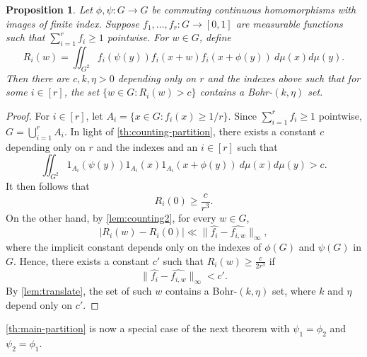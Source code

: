 \documentclass[10pt]{article}
\newtheorem{proposition}[proposition]{Proposition}
\theoremstyle{definition}
\begin{document}
\begin{proposition} \label{prop:partition-bohr-stronger} 
Let $\phi, \psi: G \to G$ be commuting continuous homomorphisms with images of finite index. Suppose $f_1, \ldots, f_r: G \to [0,1]$ are measurable functions such that $\sum_{i=1}^r f_i \geq 1$ pointwise. For $w \in G$, define
\[
  R_i(w) =  \iint_{G^2}  f_i(\psi(y)) f_i(x+w) f_i(x + \phi(y)) \ d\mu(x) d\mu(y). 
\]
Then there are $c, k, \eta >0$ depending only on $r$ and the indexes above such that for some $i \in [r]$, the set
 $\{ w \in G: R_i(w) > c\}$ contains a Bohr-$(k,\eta)$ set. 
\end{proposition}
\begin{proof}

For $i \in [r]$, let $A_i = \{x \in G: f_i(x) \geq 1/r\}$. Since $\sum_{i=1}^r f_i \geq 1$ pointwise, $G = \bigcup_{i=1}^r A_i$. In light of \cref{th:counting-partition}, there exists a constant $c$ depending only on $r$ and the indexes and an $i \in [r]$ such that 
\[
    \iint_{G^2} 1_{A_i} (\psi(y)) 1_{A_i}(x) 1_{A_i}(x + \phi(y)) \ d\mu(x) d\mu(y) > c.
\]
It then follows that
\[
    R_i(0) \geq \frac{c}{r^3}.  
\]
On the other hand, by \cref{lem:counting2}, for every $w \in G$,
\begin{equation*}
\label{eq:partition_R_i}
    |R_i(w) - R_i(0)| \ll \lVert \widehat{f_i} - \widehat{f_{i,w}} \rVert_{\infty},
\end{equation*}
where the implicit constant depends only on the indexes of $\phi(G)$ and $\psi(G)$ in $G$. 
Hence, there exists a constant $c'$ such that $R_{i}(w) \geq \frac{c}{2r^3}$ if
\begin{equation*}
    \lVert \widehat{f_{i}} - \widehat{f_{i,w}} \rVert_{\infty} < c'.
\end{equation*}
By \cref{lem:translate}, the set of such $w$ contains a Bohr-$(k,\eta)$ set, where $k$ and $\eta$ depend only on $c'$.
\end{proof}
 
\cref{th:main-partition} is now a special case of the next theorem with $\psi_1 = \phi_2$ and $\psi_2 = \phi_1$. 
\end{document}
